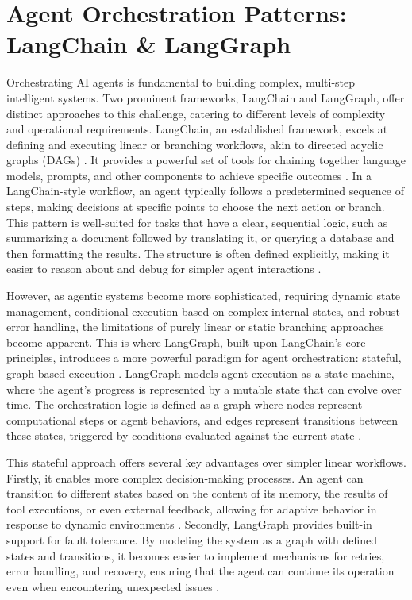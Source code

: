 \section{Agent Orchestration Patterns: LangChain \& LangGraph}

Orchestrating AI agents is fundamental to building complex, multi-step intelligent systems. Two prominent frameworks, LangChain and LangGraph, offer distinct approaches to this challenge, catering to different levels of complexity and operational requirements. LangChain, an established framework, excels at defining and executing linear or branching workflows, akin to directed acyclic graphs (DAGs) \cite{LangGraphDocs}. It provides a powerful set of tools for chaining together language models, prompts, and other components to achieve specific outcomes \cite{Reger2026}. In a LangChain-style workflow, an agent typically follows a predetermined sequence of steps, making decisions at specific points to choose the next action or branch. This pattern is well-suited for tasks that have a clear, sequential logic, such as summarizing a document followed by translating it, or querying a database and then formatting the results. The structure is often defined explicitly, making it easier to reason about and debug for simpler agent interactions \cite{LangGraphDocs}.

However, as agentic systems become more sophisticated, requiring dynamic state management, conditional execution based on complex internal states, and robust error handling, the limitations of purely linear or static branching approaches become apparent. This is where LangGraph, built upon LangChain's core principles, introduces a more powerful paradigm for agent orchestration: stateful, graph-based execution \cite{LangGraphDocs}. LangGraph models agent execution as a state machine, where the agent's progress is represented by a mutable state that can evolve over time. The orchestration logic is defined as a graph where nodes represent computational steps or agent behaviors, and edges represent transitions between these states, triggered by conditions evaluated against the current state \cite{LangGraphDocs}.

This stateful approach offers several key advantages over simpler linear workflows. Firstly, it enables more complex decision-making processes. An agent can transition to different states based on the content of its memory, the results of tool executions, or even external feedback, allowing for adaptive behavior in response to dynamic environments \cite{Reger2026}. Secondly, LangGraph provides built-in support for fault tolerance. By modeling the system as a graph with defined states and transitions, it becomes easier to implement mechanisms for retries, error handling, and recovery, ensuring that the agent can continue its operation even when encountering unexpected issues \cite{LangGraphDocs}.

